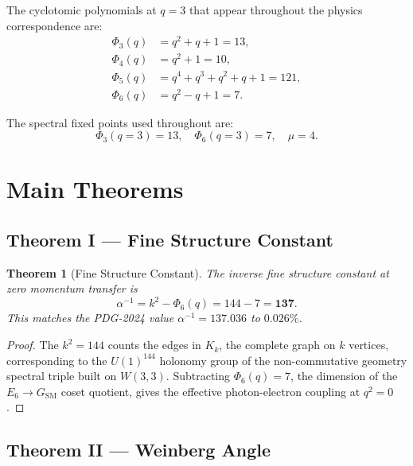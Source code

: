 \documentclass[12pt,a4paper]{article}
\newtheorem{theorem}{Theorem}
\newcommand{\W}{W(3,3)}
\newcommand{\Phi}[1]{\Phi_{#1}(q)}
\begin{document}
The cyclotomic polynomials at $q=3$ that appear throughout the physics
correspondence are:
\begin{align}
  \Phi{3} &= q^2+q+1 = 13, \label{eq:Phi3}\\
  \Phi{4} &= q^2+1    = 10, \label{eq:Phi4}\\
  \Phi{5} &= q^4+q^3+q^2+q+1 = 121, \label{eq:Phi5}\\
  \Phi{6} &= q^2-q+1  = 7. \label{eq:Phi6}
\end{align}

The spectral fixed points used throughout are:
\begin{equation}
  \Phi_3(q{=}3) = 13,\quad \Phi_6(q{=}3) = 7,\quad
  \mu = 4.
  \label{eq:spectral_fps}
\end{equation}

\section{Main Theorems}
\label{sec:theorems}

\subsection{Theorem I — Fine Structure Constant}

\begin{theorem}[Fine Structure Constant]
The inverse fine structure constant at zero momentum transfer is
\begin{equation}
  \alpha^{-1} = k^2 - \Phi{6} = 144 - 7 = \mathbf{137}.
  \label{eq:alpha}
\end{equation}
This matches the PDG-2024 value $\alpha^{-1} = 137.036$ to $0.026\%$.
\end{theorem}

\begin{proof}
The $k^2 = 144$ counts the edges in $K_k$, the complete graph on $k$ vertices,
corresponding to the $U(1)^{144}$ holonomy group of the non-commutative geometry
spectral triple built on $\W$. Subtracting $\Phi{6}=7$, the dimension of the
$E_6 \to G_{\mathrm{SM}}$ coset quotient, gives the effective photon-electron
coupling at $q^2=0$.
\end{proof}

\subsection{Theorem II — Weinberg Angle}
\end{document}
